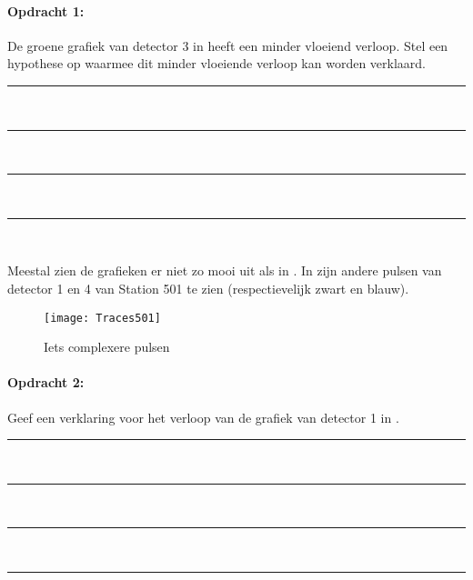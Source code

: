 \begin{minipage}[t]{1\columnwidth}%

\paragraph{Opdracht 1:}

De groene grafiek van detector 3 in 
heeft een minder vloeiend verloop. Stel een hypothese op waarmee dit
minder vloeiende verloop kan worden verklaard.

\begin{center}
    \rule{\textwidth}{0.3mm}\\
    \rule{\textwidth}{0.3mm}\\
    \rule{\textwidth}{0.3mm}\\
    \rule{\textwidth}{0.3mm}\\
\end{center}
\end{minipage}

\bigskip{}


Meestal zien de grafieken er niet zo mooi uit als in
. In 
zijn andere pulsen van detector 1 en 4 van Station 501 te zien
(respectievelijk zwart en blauw).

\begin{figure}[ht]
    \centering
    \texttt{[image: Traces501]}
    \caption{Iets complexere pulsen}
    \label{fig:Iets-complexere-pulsen}
\end{figure}


\begin{minipage}[t]{1\columnwidth}%

\paragraph{Opdracht 2:}

Geef een verklaring voor het verloop van de grafiek van detector
1 in .

\begin{center}
    \rule{\textwidth}{0.3mm}\\
    \rule{\textwidth}{0.3mm}\\
    \rule{\textwidth}{0.3mm}\\
    \rule{\textwidth}{0.3mm}\\
\end{center}
\end{minipage}

